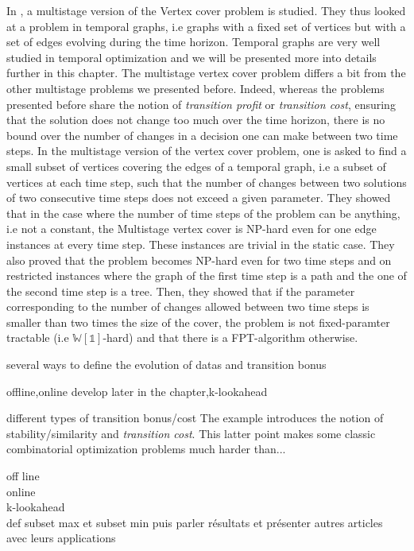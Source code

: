 \documentclass[a4paper]{book}
\begin{document}
In \cite{fluschnik2019multistage}, a multistage version of the {\sc Vertex cover} problem is studied. They thus looked at a problem in temporal graphs, i.e graphs with a fixed set of vertices but with a set of edges evolving during the time horizon. Temporal graphs are very well studied in temporal optimization and we will be presented more into details further in this chapter. The {\sc multistage vertex cover} problem differs a bit from the other multistage problems we presented before. Indeed, whereas the problems presented before share the notion of \textit{transition profit} or \textit{transition cost}, ensuring that the solution does not change too much over the time horizon, there is no bound over the number of changes in a decision one can make between two time steps. In the multistage version of the {\sc vertex cover} problem, one is asked to find a small subset of vertices covering the edges of a temporal graph, i.e a subset of vertices at each time step, such that the number of changes between two solutions of two consecutive time steps does not exceed a given parameter. They showed that in the case where the number of time steps of the problem can be anything, i.e not a constant, the {\sc Multistage vertex cover} is NP-hard even for one edge instances at every time step. These instances are trivial in the static case. They also proved that the problem becomes NP-hard even for two time steps and on restricted instances where the graph of the first time step is a path and the one of the second time step is a tree. Then, they showed that if the parameter corresponding to the number of changes allowed between two time steps is smaller than two times the size of the cover, the problem is not fixed-paramter tractable (i.e $\mathbb{W[1]}$-hard) and that there is a FPT-algorithm otherwise.

\clearpage
several ways to define the evolution of datas and transition bonus 

offline,online develop later in the chapter,k-lookahead
 


different types of transition bonus/cost
The example introduces the notion of stability/similarity and \textit{transition cost}. This latter point makes some classic combinatorial optimization problems much harder than...

off line \\
online\\
k-lookahead\\

def subset max et subset min puis parler résultats et présenter autres articles avec leurs applications
\end{document}
